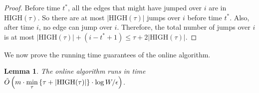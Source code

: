 \documentclass[11pt]{article}
\newtheorem{lemma}{Lemma}
\begin{document}
\begin{proof}
    Before time $t^*$, all the edges that might have jumped over $i$ are in $\text{HIGH}(\tau)$. 
    So there are at most $|\text{HIGH}(\tau)|$ jumps over $i$ before time $t^*$.
    Also, after time $i$, no edge can jump over $i$.
    Therefore, the total number of jumps over $i$ is at most $|\text{HIGH}(\tau)| + (i-t^*+1) \leq \tau + 2|\text{HIGH}(\tau)|$.   
\end{proof}

We now prove the running time guarantees of the online algorithm.  

 \begin{lemma}\label{lem:pred_runtime}
    The online algorithm runs in time $\Tilde{O}\left(m \cdot \min\limits_{\tau} \left\{\tau + |\text{HIGH}(\tau)|\right\}\cdot \log W / \epsilon \right)$.
\end{lemma}
\end{document}
